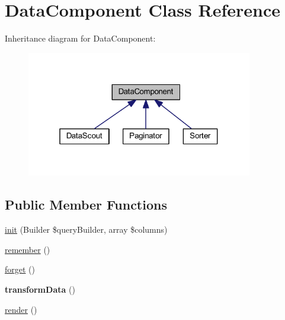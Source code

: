 \hypertarget{classhamburgscleanest_1_1_data_tables_1_1_models_1_1_data_component}{}\section{Data\+Component Class Reference}
\label{classhamburgscleanest_1_1_data_tables_1_1_models_1_1_data_component}


Inheritance diagram for Data\+Component\+:
\nopagebreak
\begin{figure}[H]
\begin{center}
\leavevmode
\includegraphics[width=280pt]{classhamburgscleanest_1_1_data_tables_1_1_models_1_1_data_component__inherit__graph}
\end{center}
\end{figure}
\subsection*{Public Member Functions}
\begin{DoxyCompactItemize}
\item 
\hyperlink{classhamburgscleanest_1_1_data_tables_1_1_models_1_1_data_component_a510fbf00bd4123cb4b3faeb8cb14bd0b}{init} (Builder \$query\+Builder, array \$columns)
\item 
\hyperlink{classhamburgscleanest_1_1_data_tables_1_1_models_1_1_data_component_a565ac6563f3548952f5b3b9807799d17}{remember} ()
\item 
\hyperlink{classhamburgscleanest_1_1_data_tables_1_1_models_1_1_data_component_a5fd46320a3fc88f4322cbb025eab7cba}{forget} ()
\item 
\mbox{\label{classhamburgscleanest_1_1_data_tables_1_1_models_1_1_data_component_a18e1ad2a8fdb81acfc1d88c1efef5f4a}} 
{\bfseries transform\+Data} ()
\item 
\hyperlink{classhamburgscleanest_1_1_data_tables_1_1_models_1_1_data_component_afde88292c44dc59faf017738dae6dffb}{render} ()
\end{DoxyCompactItemize}
